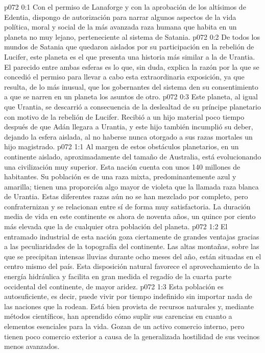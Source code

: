 \author{Melquisedec}
\vs p072 0:1 Con el permiso de Lanaforge y con la aprobación de los altísimos de Edentia, dispongo de autorización para narrar algunos aspectos de la vida política, moral y social de la más avanzada raza humana que habita en un planeta no muy lejano, perteneciente al sistema de Satania.
\vs p072 0:2 De todos los mundos de Satania que quedaron aislados por su participación en la rebelión de Lucifer, este planeta es el que presenta una historia más similar a la de Urantia. El parecido entre ambas esferas es lo que, sin duda, explica la razón por la que se concedió el permiso para llevar a cabo esta extraordinaria exposición, ya que resulta, de lo más inusual, que los gobernantes del sistema den su consentimiento a que se narren en un planeta los asuntos de otro.
\vs p072 0:3 Este planeta, al igual que Urantia, se descarrió a consecuencia de la deslealtad de su príncipe planetario con motivo de la rebelión de Lucifer. Recibió a un hijo material poco tiempo después de que Adán llegara a Urantia, y este hijo también incumplió su deber, dejando la esfera aislada, al no haberse nunca otorgado a sus razas mortales un hijo magistrado.
\vs p072 1:1 Al margen de estos obstáculos planetarios, en un continente aislado, aproximadamente del tamaño de Australia, está evolucionando una civilización muy superior. Esta nación cuenta con unos 140 millones de habitantes. Su población es de una raza mixta, predominantemente azul y amarilla; tienen una proporción algo mayor de violeta que la llamada raza blanca de Urantia. Estas diferentes razas aún no se han mezclado por completo, pero confraternizan y se relacionan entre sí de forma muy satisfactoria. La duración media de vida en este continente es ahora de noventa años, un quince por ciento más elevada que la de cualquier otra población del planeta.
\vs p072 1:2 El entramado industrial de esta nación goza ciertamente de grandes ventajas gracias a las peculiaridades de la topografía del continente. Las altas montañas, sobre las que se precipitan intensas lluvias durante ocho meses del año, están situadas en el centro mismo del país. Esta disposición natural favorece el aprovechamiento de la energía hidráulica y facilita en gran medida el regadío de la cuarta parte occidental del continente, de mayor aridez.
\vs p072 1:3 Esta población es autosuficiente, es decir, puede vivir por tiempo indefinido sin importar nada de las naciones que la rodean. Está bien provista de recursos naturales y, mediante métodos científicos, han aprendido cómo suplir sus carencias en cuanto a elementos esenciales para la vida. Gozan de un activo comercio interno, pero tienen poco comercio exterior a causa de la generalizada hostilidad de sus vecinos menos avanzados.
